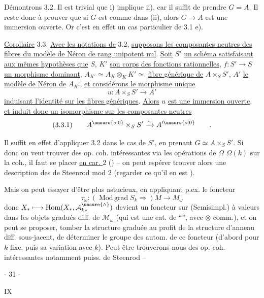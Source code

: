 Démontrons 3.2. Il est trivial que i) implique ii), car il
suffit de prendre $G=A$. Il reste donc à prouver que si $G$ est comme
dans (ii), alors $G\longrightarrow A$ est une immersion ouverte. Or c'est en effet
un cas particulier de 3.1 e).

\uline{Corollaire} 3.3. \uline{Avec les notations de} 3.2, \uline{supposons les composantes
neutres des fibres du modèle de Néron de rang unipotent nul}. \uline{Soit} $S'$
\uline{un schéma satisfaisant aux mêmes hypothèses que} $S$, $K'$ \uline{son corps des
fonctions rationnelles}, $f:S'\longrightarrow S$ \uline{un morphisme dominant},
$A_{K'}\simeq A_K\otimes_K K'\simeq$ \uline{fibre générique de} $A\times_S S'$, $A'$ \uline{le modèle de Néron de}
$A_{K'}$, \uline{et considérons le morphisme unique}
\[
 u:A\times_S S'\longrightarrow A'
\]
\uline{induisant l'identité sur les fibres génériques}. \uline{Alors} $u$ \uline{est une immersion
ouverte}, \uline{et induit donc un isomorphisme sur les composantes neutres}
\[
 (3.3.1)\qquad A^{\unsure{o|0}}\times_S S'\xrightarrow{\sim}A'^{\unsure{o|0}}\qquad.
\]

Il suffit en effet d'appliquer 3.2 dans le cas de $S'$, en
prenant $G\simeq A\times_S S'$.
Si donc on veut trouver des op. coh. intéressantes via les opérations de $\Omega$
 $\Omega(k)$ sur la coh., il faut 
se placer \uline{en car. $2$} ()
-- on peut espérer trouver alors une
description des 
de Steenrod mod $2$ (regarder ce qu'il en est ).

Mais on peut essayer d'être plus astucieux, en appliquant p.ex. le foncteur
\[
 \tau_\omega:(\operatorname{Mod\,grad}S_k\Rightarrow)M\longrightarrow M_\omega
\]
donc $X_*\longmapsto\operatorname{Hom}(X_*,\mathcal A_{k*}^{\unsure{\wedge}})$ devient un
foncteur sur (Semisimpl.) à valeurs
dans les objets  gradués diff. de $\mathcal M_\omega$
(qui est une cat. de  ``'',
avec $\otimes$ comm.), et on peut se
proposer,  tomber la structure
graduée au profit de la structure
d'anneau diff. sous-jacent, de
déterminer le groupe des autom.
de ce foncteur (d'abord pour $k$ fixe,
puis sa variation avec $k$). Peut-être
trouverons nous des op. coh. intéressantes
notamment puiss. de Steenrod --
\begin{center}- 31 -\end{center}\hfill IX

